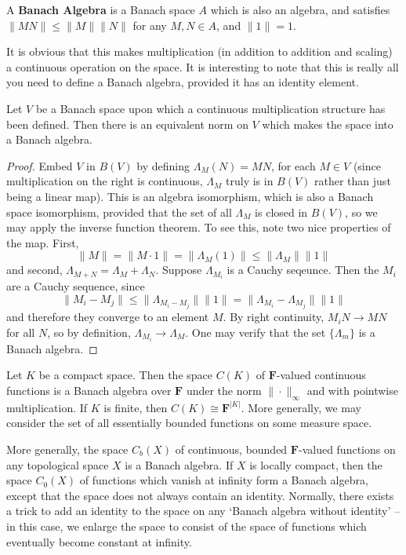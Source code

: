\begin{definition}
    A {\bf Banach Algebra} is a Banach space $A$ which is also an algebra, and satisfies $\| MN \| \leq \| M \| \| N \|$ for any $M,N \in A$, and $\| 1 \| = 1$.
\end{definition}

It is obvious that this makes multiplication (in addition to addition and scaling) a continuous operation on the space. It is interesting to note that this is really all you need to define a Banach algebra, provided it has an identity element.

\begin{theorem}
    Let $V$ be a Banach space upon which a continuous multiplication structure has been defined. Then there is an equivalent norm on $V$ which makes the space into a Banach algebra.
\end{theorem}
\begin{proof}
    Embed $V$ in $B(V)$ by defining $\Lambda_M(N) = MN$, for each $M \in V$ (since multiplication on the right is continuous, $\Lambda_M$ truly is in $B(V)$ rather than just being a linear map). This is an algebra isomorphism, which is also a Banach space isomorphism, provided  that the set of all $\Lambda_M$ is closed in $B(V)$, so we may apply the inverse function theorem. To see this, note two nice properties of the map. First,
    \[ \| M \| = \| M \cdot 1 \| = \| \Lambda_{M}(1) \| \leq \| \Lambda_{M} \| \| 1 \|  \]
    and second, $\Lambda_{M + N} = \Lambda_M + \Lambda_N$. Suppose $\Lambda_{M_i}$ is a Cauchy seqeunce. Then the $M_i$ are a Cauchy sequence, since
    \[ \| M_i - M_j \| \leq \| \Lambda_{M_i - M_j} \| \| 1 \| = \| \Lambda_{M_i} - \Lambda_{M_j} \| \| 1 \| \]
    and therefore they converge to an element $M$. By right continuity, $M_i N \to M N$ for all $N$, so by definition, $\Lambda_{M_i} \to \Lambda_M$. One may verify that the set $\{ \Lambda_m \}$ is a Banach algebra.
\end{proof}

\begin{example}
    Let $K$ be a compact space. Then the space $C(K)$ of $\mathbf{F}$-valued continuous functions is a Banach algebra over $\mathbf{F}$ under the norm $\| \cdot \|_\infty$ and with pointwise multiplication. If $K$ is finite, then $C(K) \cong \mathbf{F}^{|K|}$. More generally, we may consider the set of all essentially bounded functions on some measure space.
\end{example}

\begin{example}
    More generally, the space $C_b(X)$ of continuous, bounded $\mathbf{F}$-valued functions on any topological space $X$ is a Banach algebra. If $X$ is locally compact, then the space $C_0(X)$ of functions which vanish at infinity form a Banach algebra, except that the space does not always contain an identity. Normally, there exists a trick to add an identity to the space on any `Banach algebra without identity' -- in this case, we enlarge the space to consist of the space of functions which eventually become constant at infinity.
\end{example}

